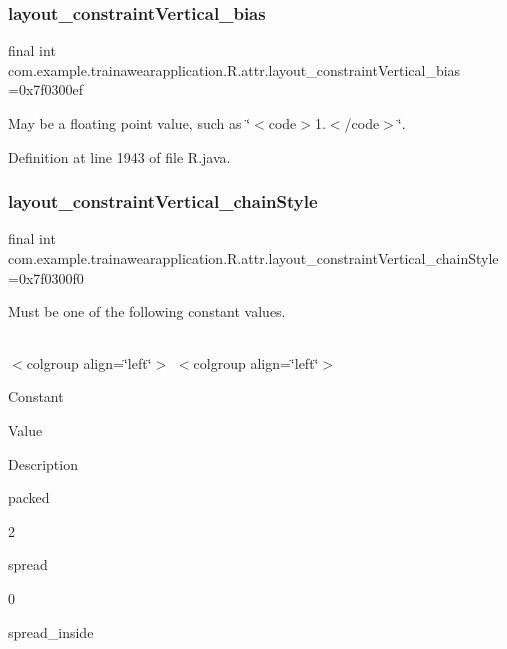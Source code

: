\subsubsection{\texorpdfstring{layout\_constraintVertical\_bias}{layout\_constraintVertical\_bias}}
{\footnotesize\ttfamily final int com.\+example.\+trainawearapplication.\+R.\+attr.\+layout\+\_\+constraint\+Vertical\+\_\+bias =0x7f0300ef\hspace{0.3cm}{\ttfamily [static]}}

May be a floating point value, such as \char`\"{}$<$code$>$1.$<$/code$>$\char`\"{}. 

Definition at line 1943 of file R.\+java.

\mbox{\label{classcom_1_1example_1_1trainawearapplication_1_1_r_1_1attr_abbd3aadd659e4175eaef3446d4df72fa}} 
\subsubsection{\texorpdfstring{layout\_constraintVertical\_chainStyle}{layout\_constraintVertical\_chainStyle}}
{\footnotesize\ttfamily final int com.\+example.\+trainawearapplication.\+R.\+attr.\+layout\+\_\+constraint\+Vertical\+\_\+chain\+Style =0x7f0300f0\hspace{0.3cm}{\ttfamily [static]}}

Must be one of the following constant values.

\tabulinesep=1mm
\begin{longtabu}spread 0pt [c]{*{0}{|X[-1]}|}
\hline
\end{longtabu}
$<$colgroup align=\char`\"{}left\char`\"{}$>$ $<$colgroup align=\char`\"{}left\char`\"{}$>$ 

Constant

Value

Description 

packed

2

spread

0

spread\+\_\+inside

